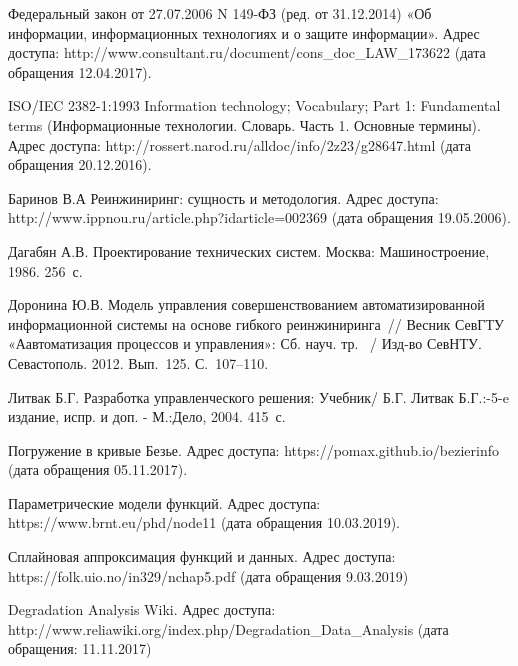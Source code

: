 \begingroup
\renewcommand{\section}[2]{\anonsection{Библиографический список}}
\begin{thebibliography}{00}

 Федеральный закон от 27.07.2006 N 149-ФЗ (ред. от 31.12.2014) «Об информации, информационных технологиях и о защите информации».
Адрес доступа: http://www.consultant.ru/document/cons\_doc\_LAW\_173622 (дата обращения 12.04.2017).

 ISO/IEC 2382-1:1993 Information technology; Vocabulary; Part 1: Fundamental terms (Информационные технологии. Словарь. Часть 1. Основные термины).
Адрес доступа: http://rossert.narod.ru/alldoc/info/2z23/g28647.html (дата обращения 20.12.2016).

Баринов В.А Реинжиниринг: сущность и методология. 
Адрес доступа: http://www.ippnou.ru/article.php?idarticle=002369 (дата обращения 19.05.2006).

Дагабян А.В. Проектирование технических систем. 
Москва: Машиностроение, 1986. 256~с.

Доронина Ю.В. Модель управления совершенствованием автоматизированной информационной системы на основе гибкого реинжиниринга~//
 Весник СевГТУ «Аавтоматизация процессов и управления»: Сб. науч. тр. ~/ Изд-во СевНТУ. Севастополь. 2012. Вып.~125. С.~107--110.

Литвак Б.Г. Разработка управленческого решения: Учебник/ 
Б.Г. Литвак Б.Г.:-5-e издание, испр. и доп. - М.:Дело, 2004. 415~с.

Погружение в кривые Безье. 
Адрес доступа: https://pomax.github.io/bezierinfo (дата обращения 05.11.2017).

Параметрические модели функций.
Адрес доступа: https://www.brnt.eu/phd/node11 (дата обращения 10.03.2019). 

Сплайновая аппроксимация функций и данных.
Адрес доступа: https://folk.uio.no/in329/nchap5.pdf (дата обращения 9.03.2019)

Degradation Analysis Wiki.
Адрес доступа: http://www.reliawiki.org/index.php/Degradation\_Data\_Analysis (дата обращения: 11.11.2017)



\end{thebibliography}
